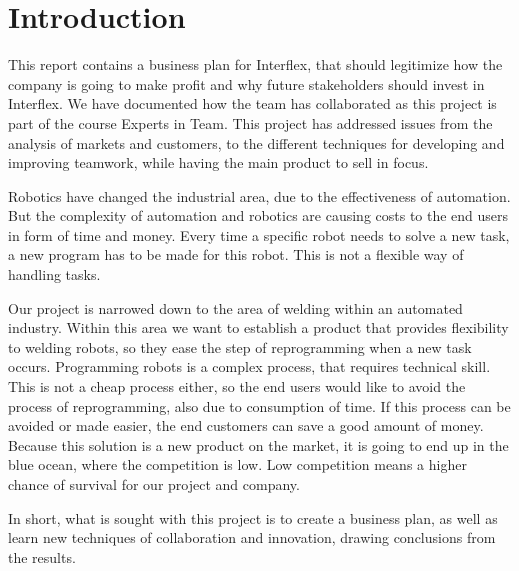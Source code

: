 \section{Introduction}

This report contains a business plan for Interflex, that should legitimize how the company is going to make profit and why future stakeholders should invest in Interflex. 
We have documented how the team has collaborated as this project is part of the course Experts in Team.
This project has addressed issues from the analysis of markets and customers, to the different techniques for developing and improving teamwork, while having the main product to sell in focus.

Robotics have changed the industrial area, due to the effectiveness of automation. But the complexity of automation and robotics are causing costs to the end users in form of time and money. Every time a specific robot needs to solve a new task, a new program has to be made for this robot. This is not a flexible way of handling tasks. 

Our project is narrowed down to the area of welding within an automated industry. Within this area we want to establish a product that provides flexibility to welding robots, so they ease the step of reprogramming when a new task occurs. Programming robots is a complex process, that requires technical skill. This is not a cheap process either, so the end users would like to avoid the process of reprogramming, also due to consumption of time. If this process can be avoided or made easier, the end customers can save a good amount of money. Because this solution is a new product on the market, it is going to end up in the blue ocean, where the competition is low. Low competition means a higher chance of survival for our project and company.

In short, what is sought with this project is to create a business plan, as well as learn new techniques of collaboration and innovation, drawing conclusions from the results.